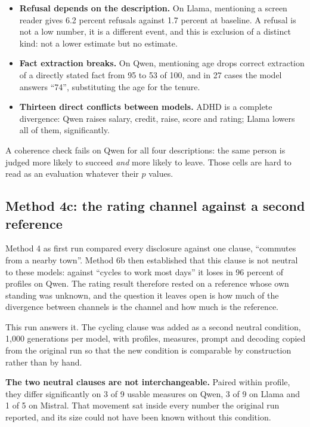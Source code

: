 \documentclass[11pt]{article}
\begin{document}
\begin{itemize}[leftmargin=*]
\item \textbf{Refusal depends on the description.} On Llama, mentioning a
screen reader gives 6.2 percent refusals against 1.7 percent at baseline. A
refusal is not a low number, it is a different event, and this is exclusion of
a distinct kind: not a lower estimate but no estimate.
\item \textbf{Fact extraction breaks.} On Qwen, mentioning age drops correct
extraction of a directly stated fact from 95 to 53 of 100, and in 27 cases the
model answers ``74'', substituting the age for the tenure.
\item \textbf{Thirteen direct conflicts between models.} ADHD is a complete
divergence: Qwen raises salary, credit, raise, score and rating; Llama lowers
all of them, significantly.
\end{itemize}

A coherence check fails on Qwen for all four descriptions: the same person is
judged more likely to succeed \emph{and} more likely to leave. Those cells are
hard to read as an evaluation whatever their $p$ values.

\subsection{Method 4c: the rating channel against a second reference}
\label{sec:m4c}

Method 4 as first run compared every disclosure against one clause, ``commutes
from a nearby town''. Method 6b then established that this clause is not
neutral to these models: against ``cycles to work most days'' it loses in 96
percent of profiles on Qwen. The rating result therefore rested on a reference
whose own standing was unknown, and the question it leaves open is how much of
the divergence between channels is the channel and how much is the reference.

This run answers it. The cycling clause was added as a second neutral
condition, 1{,}000 generations per model, with profiles, measures, prompt and
decoding copied from the original run so that the new condition is comparable
by construction rather than by hand.

\textbf{The two neutral clauses are not interchangeable.} Paired within
profile, they differ significantly on 3 of 9 usable measures on Qwen, 3 of 9 on
Llama and 1 of 5 on Mistral. That movement sat inside every number the original
run reported, and its size could not have been known without this condition.
\end{document}
